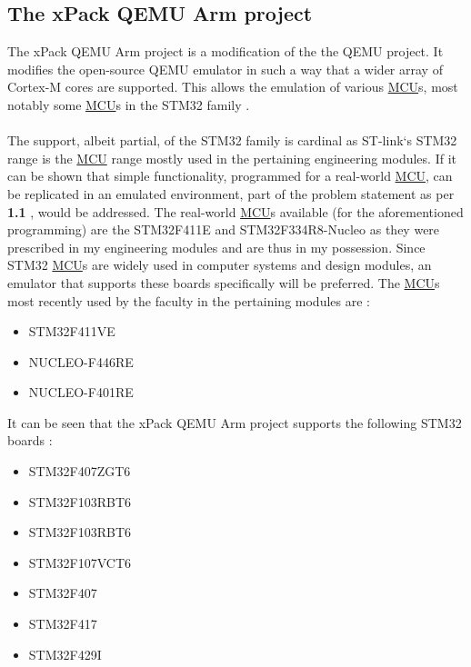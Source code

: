 \subsection{The xPack QEMU Arm project}
\label{xpack}
The xPack QEMU Arm project is a modification of the the QEMU project. It modifies the open-source QEMU emulator in such a way that a wider array of Cortex-M cores are supported. This allows the emulation of various \hyperref[listAbr]{MCU}s, most notably some \hyperref[listAbr]{MCU}s in the STM32 family \cite{xPack}.
\\\\
The support, albeit partial, of the STM32 family is cardinal as ST-link`s STM32  range is the \hyperref[listAbr]{MCU} range mostly used in the pertaining engineering modules. If it can be shown that simple functionality, programmed for a real-world \hyperref[listAbr]{MCU}, can be replicated in an emulated environment, part of the problem statement as per \textbf{1.1 }, would be addressed. The real-world \hyperref[listAbr]{MCU}s available (for the aforementioned programming) are the STM32F411E and STM32F334R8-Nucleo as they were prescribed in my engineering modules and are thus in my possession. Since STM32 \hyperref[listAbr]{MCU}s are widely used in computer systems and design modules, an emulator that supports these boards specifically will be preferred. The \hyperref[listAbr]{MCU}s most recently used by the faculty in the pertaining modules are \cite{emailVis}:

\begin{itemize}
\item STM32F411VE
\item  NUCLEO-F446RE
\item   NUCLEO-F401RE 
\end{itemize}



It can be seen that the xPack QEMU Arm project supports the following STM32 boards  \cite{xPack}:

\begin{itemize}
\item STM32F407ZGT6
\item STM32F103RBT6
\item STM32F103RBT6
\item STM32F107VCT6
\item STM32F407
\item STM32F417
\item STM32F429I
\end{itemize}

